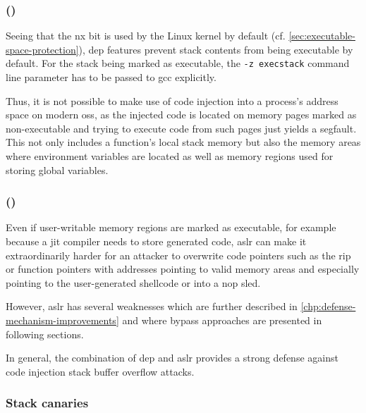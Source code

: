 \subsubsection{ ()}
\label{subsubsec:ci-data-execution-prevention}

Seeing that the \gls{nx} bit is used by the Linux kernel by default (cf. \cref{sec:executable-space-protection}), \gls{dep} features prevent stack contents from being executable by default.
For the stack being marked as executable, the \texttt{-z execstack} command line parameter has to be passed to \gls{gcc} explicitly.

Thus, it is not possible to make use of code injection into a process's address space on modern \glspl{os}, as the injected code is located on memory pages marked as non-executable and trying to execute code from such pages just yields a \gls{segfault}.
This not only includes a function's local stack memory but also the memory areas where environment variables are located as well as memory regions used for storing global variables.

\subsubsection{ ()}
\label{subsubsec:ci-aslr}

Even if user-writable memory regions are marked as executable, for example because a \gls{jit} compiler needs to store generated code, \gls{aslr} can make it extraordinarily harder for an attacker to overwrite code pointers such as the \gls{rip} or function pointers with addresses pointing to valid memory areas and especially pointing to the user-generated shellcode or into a \gls{nop} sled.

However, \gls{aslr} has several weaknesses which are further described in \cref{chp:defense-mechanism-improvements} and where bypass approaches are presented in following sections.

In general, the combination of \gls{dep} and \gls{aslr} provides a strong defense against code injection stack buffer overflow attacks.

\subsubsection{Stack canaries}
\label{subsubsec:ci-stack-canaries}

